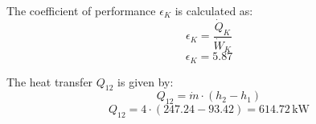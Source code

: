 The coefficient of performance \( \epsilon_K \) is calculated as:  
\[
\epsilon_K = \frac{\dot{Q}_K}{\dot{W}_K}
\]  
\[
\epsilon_K = 5.87
\]  

The heat transfer \( Q_{12} \) is given by:  
\[
Q_{12} = \dot{m} \cdot (h_2 - h_1)
\]  
\[
Q_{12} = 4 \cdot (247.24 - 93.42) = 614.72 \, \text{kW}
\]